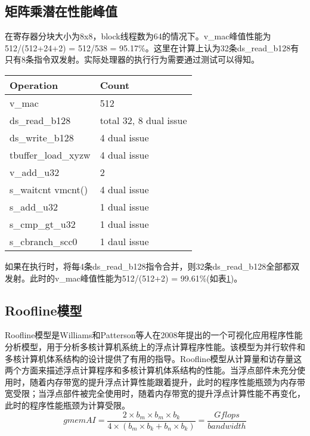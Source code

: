 \subsection{矩阵乘潜在性能峰值}
在寄存器分块大小为8x8，block线程数为64的情况下。v\_mac峰值性能为512/(512+24+2) = 512/538 = 95.17\%。这里在计算上认为32条ds\_read\_b128有只有8条指令双发射。实际处理器的执行行为需要通过测试可以得知。
\begin{table}[htbp]
	\label{tab:fijiFFMA}
	\begin{center}
		\begin{tabular}{ | l | p{4cm} |}
			\hline
			Operation & Count \\ \hline
			v\_mac & 512  \\ \hline
			ds\_read\_b128 & total 32, 8 dual issue \\ \hline
			ds\_write\_b128 & 4 dual issue \\ \hline
			tbuffer\_load\_xyzw & 4 dual issue \\ \hline
			v\_add\_u32 & 2 \\ \hline
			s\_waitcnt vmcnt() & 4 dual issue \\ \hline
			s\_add\_u32 & 1 dual issue \\ \hline
			s\_cmp\_gt\_u32 & 1 dual issue \\ \hline
			s\_cbranch\_scc0 & 1 daul issue \\
			\hline
		\end{tabular}
	\end{center}	
\end{table}

如果在执行时，将每4条ds\_read\_b128指令合并，则32条ds\_read\_b128全部都双发射。此时的v\_mac峰值性能为512/(512+2) = 99.61\%(如表\ref{tab:fijiFFMA})。

\subsection{Roofline模型}
Roofline模型是Williams和Patterson等人在2008年提出的一个可视化应用程序性能分析模型，用于分析多核计算机系统上的浮点计算程序性能。该模型为并行软件和多核计算机体系结构的设计提供了有用的指导。Roofline模型从计算量和访存量这两个方面来描述浮点计算程序和多核计算机体系结构的性能。当浮点部件未充分使用时，随着内存带宽的提升浮点计算性能跟着提升，此时的程序性能瓶颈为内存带宽受限；当浮点部件被完全使用时，随着内存带宽的提升浮点计算性能不再变化，此时的程序性能瓶颈为计算受限。
\begin{equation}
\label{eq:global_arith_intensity}
gmemAI = \frac{2 \times b_m \times b_m \times b_k}{4\times (b_m \times b_k + b_n\times b_k)} = \frac{Gflops}{bandwidth}
\end{equation}


